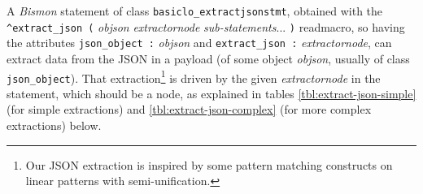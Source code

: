 A \emph{Bismon} statement of class \texttt{basiclo\_extractjsonstmt},
obtained with the \texttt{{\^{}}{extract\_json} (} \textit{objson}
\textit {extractornode} \textit{sub-statements}... \texttt{)}
readmacro, so having the attributes \texttt{json\_object :}
\textit{objson} and \texttt{extract\_json :} \textit{extractornode},
 
 can extract data from the JSON in a
payload (of some object \textit{objson}, usually of class
\texttt{json\_object}). That extraction\footnote{Our JSON extraction
  is inspired by some pattern matching constructs on linear patterns
  with semi-unification.}  is driven by
the given \textit{extractornode} in the statement, which should be a
node, as explained in tables \ref{tbl:extract-json-simple} (for simple
extractions) and \ref{tbl:extract-json-complex} (for more complex
extractions) below.

